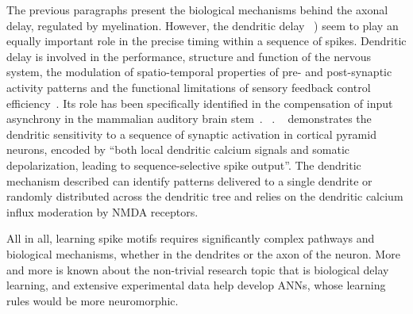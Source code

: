 \documentclass[brainsci, %
               review,submit,pdftex,moreauthors
               ]{Definitions/mdpi}
\begin{document}
The previous paragraphs present the biological mechanisms behind the axonal delay, regulated by myelination. However, the dendritic delay ~\citep{seidl_mechanisms_2010}) seem to play an equally important role in the precise timing within a sequence of spikes. Dendritic delay is involved in the performance, structure and function of the nervous system, the modulation of spatio-temporal properties of pre- and post-synaptic activity patterns and the functional limitations of sensory feedback control efficiency~\citep{madadi_asl_dendritic_2018}. Its role has been specifically identified in the compensation of input asynchrony in the mammalian auditory brain stem~\citep{spencer_compensation_2018}. \citet{mel_synaptic_2017} ~\citep{golding_dendritic_2002}. ~\citet{branco_dendritic_2010} demonstrates the dendritic sensitivity to a sequence of synaptic activation in cortical pyramid neurons, encoded by ``both local dendritic calcium signals and somatic depolarization, leading to sequence-selective spike output''. The dendritic mechanism described can identify patterns delivered to a single dendrite or randomly distributed across the dendritic tree and relies on the dendritic calcium influx moderation by NMDA receptors.

All in all, learning spike motifs requires significantly complex pathways and biological mechanisms, whether in the dendrites or the axon of the neuron. More and more is known about the non-trivial research topic that is biological delay learning, and extensive experimental data help develop ANNs, whose learning rules would be more neuromorphic. 
%
\end{document}
